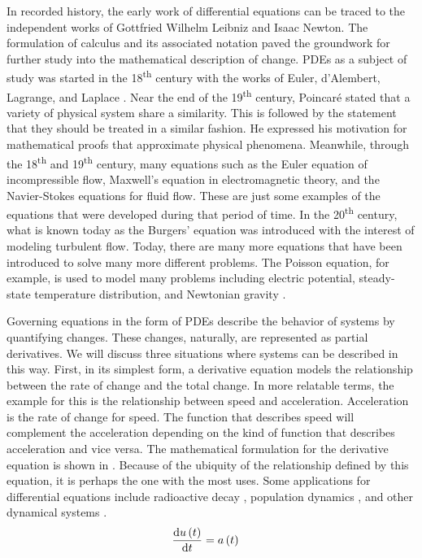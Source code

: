 In recorded history, the early work of differential equations can be traced to the independent works of Gottfried Wilhelm Leibniz and Isaac Newton. The formulation of calculus and its associated notation paved the groundwork for further study into the mathematical description of change. PDEs as a subject of study was started in the 18\textsuperscript{th} century with the works of Euler, d'Alembert, Lagrange, and Laplace \autocite{brezisPartialDifferentialEquations1998}. Near the end of the 19\textsuperscript{th} century, Poincar\'e stated that a variety of physical system share a similarity. This is followed by the statement that they should be treated in a similar fashion. He expressed his motivation for mathematical proofs that approximate physical phenomena. Meanwhile, through the 18\textsuperscript{th} and 19\textsuperscript{th} century, many equations such as the Euler equation of incompressible flow, Maxwell's equation in electromagnetic theory, and the Navier-Stokes equations for fluid flow. These are just some examples of the equations that were developed during that period of time. In the 20\textsuperscript{th} century, what is known today as the Burgers' equation was introduced with the interest of modeling turbulent flow. Today, there are many more equations that have been introduced to solve many more different problems. The Poisson equation, for example, is used to model many problems including electric potential, steady-state temperature distribution, and Newtonian gravity \autocite{selvaduraiPartialDifferentialEquations2000}.

Governing equations in the form of PDEs describe the behavior of systems by quantifying changes. These changes, naturally, are represented as partial derivatives. We will discuss three situations where systems can be described in this way. First, in its simplest form, a derivative equation models the relationship between the rate of change and the total change. In more relatable terms, the example for this is the relationship between speed and acceleration. Acceleration is the rate of change for speed. The function that describes speed will complement the acceleration depending on the kind of function that describes acceleration and vice versa. The mathematical formulation for the derivative equation is shown in . Because of the ubiquity of the relationship defined by this equation, it is perhaps the one with the most uses. Some applications for differential equations include radioactive decay \autocite{grochRadioactiveDecay1998,huestisUnderstandingOriginMeaning2002}, population dynamics \autocite{gopalsamyStabilityOscillationsDelay1992}, and other dynamical systems \autocite{katokIntroductionModernTheory2009}.
\begin{align}
  \dv{u\left( t \right)}{t} & = a\left( t \right) \label{eq:derivative}
\end{align}

